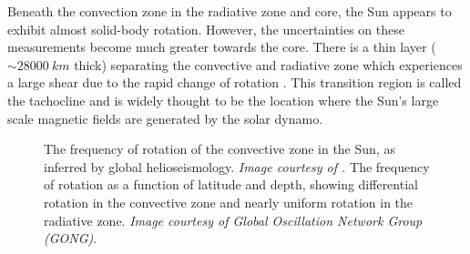 \documentclass[11pt,a4paper,onecolumn]{report}
\begin{document}
Beneath the convection zone in the radiative zone and core, the Sun appears to
exhibit almost solid-body rotation. However, the uncertainties on these
measurements become much greater towards the core. There is a thin layer
(\(\sim \SI{28000}{km}\) thick) separating the convective and radiative zone which
experiences a large shear due to the rapid change of rotation
\citep{spiegel1992}. This transition region is called the tachocline and is
widely thought to be the location where the Sun's large scale magnetic fields are
generated by the solar dynamo.

\begin{figure}[t]%
  \centering
  \qquad
  \caption[]{ The frequency of rotation of the
    convective zone in the Sun, as inferred by global helioseismology.
    \textit{Image courtesy of \citet{thompson_helioseismology_2004}.}
     The
    frequency of rotation as a function of latitude and depth, showing differential
    rotation in the convective zone and nearly uniform rotation in the radiative
    zone. \textit{Image courtesy of Global Oscillation Network Group
    (GONG)}.}
  \label{fig:solar_rotation}
\end{figure}
\end{document}
